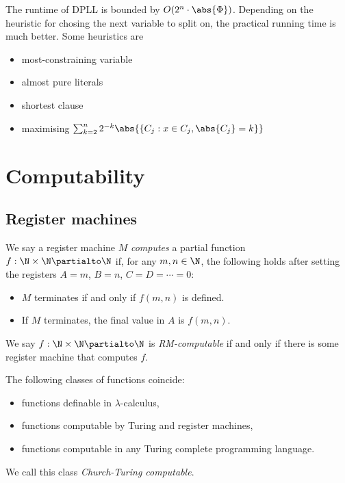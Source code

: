 \documentclass{article}
\begin{document}
\begin{theorem}
	The runtime of DPLL is bounded by $O(2^n\cdot\abs{\Phi})$. Depending on the
	heuristic for chosing the next variable to split on, the practical running
	time is much better. Some heuristics are
	\begin{itemize}
		\item most-constraining variable
		\item almost pure literals
		\item shortest clause
		\item maximising $\sum_{k=2}^n 2^{-k} \abs{\{C_j : x\in C_j, \abs{C_j}=k\}}$
	\end{itemize}
\end{theorem}

\section{Computability}

\subsection{Register machines}

\begin{definition}
	We say a register machine $M$ \emph{computes} a partial function
	$f:\N\times\N\partialto\N$ if, for any $m,n\in\N$, the following
	holds after setting the registers $A=m$, $B=n$, $C=D=\cdots=0$:
	\begin{itemize}
		\item $M$ terminates if and only if $f(m,n)$ is defined.
		\item If $M$ terminates, the final value in $A$ is $f(m,n)$.
	\end{itemize}
	We say $f:\N\times\N\partialto\N$ is \emph{RM-computable} if and
	only if there is some register machine that computes $f$.
\end{definition}

\begin{theorem}
	The following classes of functions coincide:
	\begin{itemize}
		\item functions definable in $\lambda$-calculus,
		\item functions computable by Turing and register machines,
		\item functions computable in any Turing complete programming language.
	\end{itemize}
	We call this class \emph{Church-Turing computable}.
\end{theorem}
\end{document}
